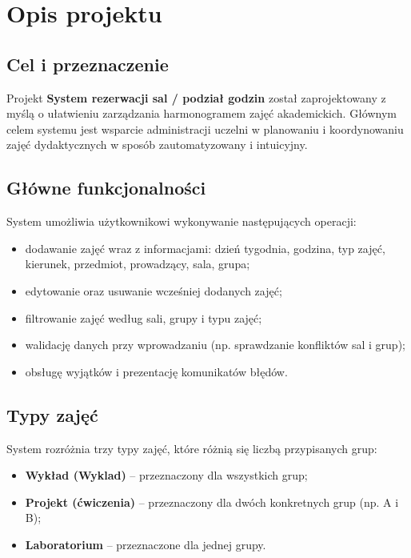 \chapter{Opis projektu}

\section{Cel i przeznaczenie}

Projekt \textbf{System rezerwacji sal / podział godzin} został zaprojektowany z myślą o ułatwieniu zarządzania harmonogramem zajęć akademickich.  
Głównym celem systemu jest wsparcie administracji uczelni w planowaniu i koordynowaniu zajęć dydaktycznych w sposób zautomatyzowany i intuicyjny.

\section{Główne funkcjonalności}

System umożliwia użytkownikowi wykonywanie następujących operacji:

\begin{itemize}
    \item dodawanie zajęć wraz z informacjami: dzień tygodnia, godzina, typ zajęć, kierunek, przedmiot, prowadzący, sala, grupa;
    \item edytowanie oraz usuwanie wcześniej dodanych zajęć;
    \item filtrowanie zajęć według sali, grupy i typu zajęć;
    \item walidację danych przy wprowadzaniu (np. sprawdzanie konfliktów sal i grup);
    \item obsługę wyjątków i prezentację komunikatów błędów.
\end{itemize}

\section{Typy zajęć}

System rozróżnia trzy typy zajęć, które różnią się liczbą przypisanych grup:

\begin{itemize}
    \item \textbf{Wykład (Wyklad)} – przeznaczony dla wszystkich grup;
    \item \textbf{Projekt (ćwiczenia)} – przeznaczony dla dwóch konkretnych grup (np. A i B);
    \item \textbf{Laboratorium} – przeznaczone dla jednej grupy.
\end{itemize}

